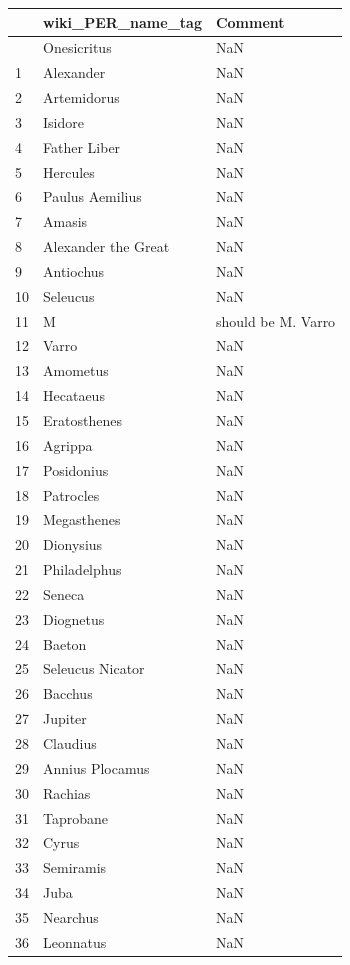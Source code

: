 \documentclass[
  12pt,
]{article}
\begin{document}
\begin{longtable}[]{@{}lll@{}}
\toprule\noalign{}
& wiki\_PER\_name\_tag & Comment \\
\midrule\noalign{}
\endhead
\bottomrule\noalign{}
\endlastfoot
0 & Onesicritus & NaN \\
1 & Alexander & NaN \\
2 & Artemidorus & NaN \\
3 & Isidore & NaN \\
4 & Father Liber & NaN \\
5 & Hercules & NaN \\
6 & Paulus Aemilius & NaN \\
7 & Amasis & NaN \\
8 & Alexander the Great & NaN \\
9 & Antiochus & NaN \\
10 & Seleucus & NaN \\
11 & M & should be M. Varro \\
12 & Varro & NaN \\
13 & Amometus & NaN \\
14 & Hecataeus & NaN \\
15 & Eratosthenes & NaN \\
16 & Agrippa & NaN \\
17 & Posidonius & NaN \\
18 & Patrocles & NaN \\
19 & Megasthenes & NaN \\
20 & Dionysius & NaN \\
21 & Philadelphus & NaN \\
22 & Seneca & NaN \\
23 & Diognetus & NaN \\
24 & Baeton & NaN \\
25 & Seleucus Nicator & NaN \\
26 & Bacchus & NaN \\
27 & Jupiter & NaN \\
28 & Claudius & NaN \\
29 & Annius Plocamus & NaN \\
30 & Rachias & NaN \\
31 & Taprobane & NaN \\
32 & Cyrus & NaN \\
33 & Semiramis & NaN \\
34 & Juba & NaN \\
35 & Nearchus & NaN \\
36 & Leonnatus & NaN \\

\end{longtable}
\end{document}
